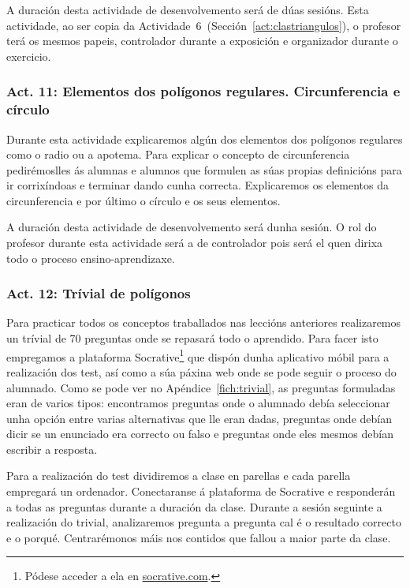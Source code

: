 A duración desta actividade de desenvolvemento será de dúas sesións. Esta actividade, ao ser copia da Actividade~6~(Sección~\ref{act:clastriangulos}), o profesor terá os mesmos papeis, controlador durante a exposición e organizador durante o exercicio.

\subsubsection{Act. 11: Elementos dos polígonos regulares. Circunferencia e círculo}\label{act:elementos}
Durante esta actividade explicaremos algún dos elementos dos polígonos regulares como o radio ou a apotema. Para explicar o concepto de circunferencia pedirémoslles ás alumnas e alumnos que formulen as súas propias definicións para ir corrixíndoas e terminar dando cunha correcta. Explicaremos os elementos da circunferencia e por último o círculo e os seus elementos.

A duración desta actividade de desenvolvemento será dunha sesión. O rol do profesor durante esta actividade será a de controlador pois será el quen dirixa todo o proceso ensino-aprendizaxe.

\subsubsection{Act. 12: Trívial de polígonos}\label{act:trivial}
Para practicar todos os conceptos traballados nas leccións anteriores realizaremos un trívial de 70 preguntas onde se repasará todo o aprendido. Para facer isto empregamos a plataforma Socrative\footnote{Pódese acceder a ela en \href{http://www.socrative.com/}{socrative.com}.} que dispón dunha aplicativo móbil para a realización dos test, así como a súa páxina web onde se pode seguir o proceso do alumnado. Como se pode ver no Apéndice~\ref{fich:trivial}, as preguntas formuladas eran de varios tipos: encontramos preguntas onde o alumnado debía seleccionar unha opción entre varias alternativas que lle eran dadas, preguntas onde debían dicir se un enunciado era correcto ou falso e preguntas onde eles mesmos debían escribir a resposta.

Para a realización do test dividiremos a clase en parellas e cada parella empregará un ordenador. Conectaranse á plataforma de Socrative e responderán a todas as preguntas durante a duración da clase. Durante a sesión seguinte a realización do trivial, analizaremos pregunta a pregunta cal é o resultado correcto e o porqué. Centrarémonos máis nos contidos que fallou a maior parte da clase.

